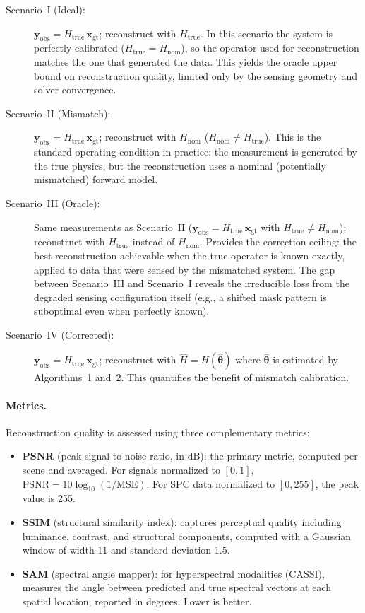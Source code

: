 \documentclass[11pt]{article}
\newcommand{\Hnom}{H_{\mathrm{nom}}}
\newcommand{\Htrue}{H_{\mathrm{true}}}
\newcommand{\xgt}{\mathbf{x}_{\mathrm{gt}}}
\newcommand{\yobs}{\mathbf{y}_{\mathrm{obs}}}
\newcommand{\psnr}{\mathrm{PSNR}}
\begin{document}
\begin{description}
  \item[Scenario~I (Ideal):]
    $\yobs = \Htrue\, \xgt$; reconstruct with $\Htrue$.
    In this scenario the system is perfectly calibrated ($\Htrue = \Hnom$),
    so the operator used for reconstruction matches the one that generated
    the data.  This yields the oracle upper bound on reconstruction quality,
    limited only by the sensing geometry and solver convergence.
  \item[Scenario~II (Mismatch):]
    $\yobs = \Htrue\, \xgt$; reconstruct with $\Hnom$
    ($\Hnom \neq \Htrue$).
    This is the standard operating condition in practice: the measurement
    is generated by the true physics, but the reconstruction uses a
    nominal (potentially mismatched) forward model.
  \item[Scenario~III (Oracle):]
    Same measurements as Scenario~II
    ($\yobs = \Htrue\, \xgt$ with $\Htrue \neq \Hnom$);
    reconstruct with $\Htrue$ instead of $\Hnom$.
    Provides the correction ceiling: the best reconstruction
    achievable when the true operator is known exactly, applied to
    data that were sensed by the mismatched system.  The gap between
    Scenario~III and Scenario~I reveals the irreducible loss from
    the degraded sensing configuration itself (e.g., a shifted mask
    pattern is suboptimal even when perfectly known).
  \item[Scenario~IV (Corrected):]
    $\yobs = \Htrue\, \xgt$; reconstruct with
    $\hat{H} = H(\hat{\boldsymbol{\theta}})$ where
    $\hat{\boldsymbol{\theta}}$ is estimated by Algorithms~1 and~2.
    This quantifies the benefit of mismatch calibration.
\end{description}

\paragraph{Metrics.}
Reconstruction quality is assessed using three complementary metrics:
\begin{itemize}
  \item \textbf{PSNR} (peak signal-to-noise ratio, in dB): the primary
    metric, computed per scene and averaged.  For signals normalized to
    $[0, 1]$, $\psnr = 10 \log_{10}(1 / \text{MSE})$.  For SPC data
    normalized to $[0, 255]$, the peak value is 255.
  \item \textbf{SSIM} (structural similarity index): captures perceptual
    quality including luminance, contrast, and structural components,
    computed with a Gaussian window of width 11 and standard deviation
    1.5.
  \item \textbf{SAM} (spectral angle mapper): for hyperspectral
    modalities (CASSI), measures the angle between predicted and true
    spectral vectors at each spatial location, reported in degrees.
    Lower is better.
\end{itemize}
\end{document}
